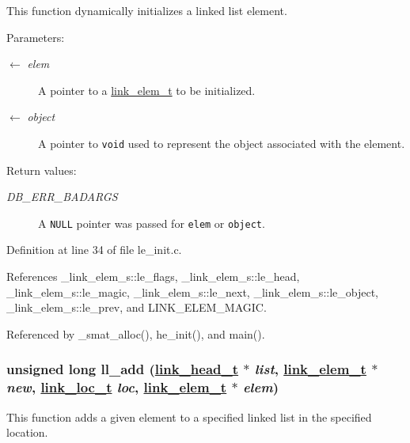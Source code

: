 This function dynamically initializes a linked list element.

\begin{Desc}
\item[Parameters:]
\begin{description}
\item[\mbox{$\leftarrow$} {\em elem}]A pointer to a \hyperlink{group__dbprim__link_ga1}{link\_\-elem\_\-t} to be initialized. \item[\mbox{$\leftarrow$} {\em object}]A pointer to {\tt void} used to represent the object associated with the element.\end{description}
\end{Desc}
\begin{Desc}
\item[Return values:]
\begin{description}
\item[{\em DB\_\-ERR\_\-BADARGS}]A {\tt NULL} pointer was passed for {\tt elem} or {\tt object}.\end{description}
\end{Desc}


Definition at line 34 of file le\_\-init.c.

References \_\-link\_\-elem\_\-s::le\_\-flags, \_\-link\_\-elem\_\-s::le\_\-head, \_\-link\_\-elem\_\-s::le\_\-magic, \_\-link\_\-elem\_\-s::le\_\-next, \_\-link\_\-elem\_\-s::le\_\-object, \_\-link\_\-elem\_\-s::le\_\-prev, and LINK\_\-ELEM\_\-MAGIC.

Referenced by \_\-smat\_\-alloc(), he\_\-init(), and main().\hypertarget{group__dbprim__link_ga6}{
\subsubsection[ll\_\-add]{\setlength{\rightskip}{0pt plus 5cm}unsigned long ll\_\-add (\hyperlink{struct__link__head__s}{link\_\-head\_\-t} $\ast$ {\em list}, \hyperlink{struct__link__elem__s}{link\_\-elem\_\-t} $\ast$ {\em new}, \hyperlink{group__dbprim__link_ga4}{link\_\-loc\_\-t} {\em loc}, \hyperlink{struct__link__elem__s}{link\_\-elem\_\-t} $\ast$ {\em elem})}}
\label{group__dbprim__link_ga6}


This function adds a given element to a specified linked list in the specified location.

